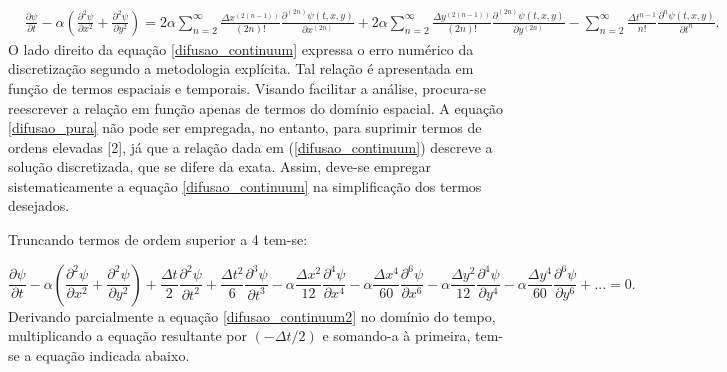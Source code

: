 \documentclass[10pt,twoside,a4paper]{article}
\begin{document}
	\begin{equation} \label{difusao_continuum}
	\begin{split}
	&\frac{\partial \psi}{\partial t} - \alpha \left( \frac{\partial^{2} \psi}{\partial x^{2}} + \frac{\partial^{2} \psi}{\partial y^{2}} \right) = 2 \alpha \sum\limits_{n=2}^{\infty} \frac{ \Delta x^{\left(2\left(n-1\right)\right)}}{\left(2n\right)!} \frac{\partial^{\left(2n\right)} \psi \left(t, x, y\right)}{\partial x^{\left(2n\right)}} + 2 \alpha \sum\limits_{n=2}^{\infty} \frac{ \Delta y^{\left(2\left(n-1\right)\right)}}{\left(2n\right)!} \frac{\partial^{\left(2n\right)} \psi \left(t, x, y\right)}{\partial y^{\left(2n\right)}} - \sum\limits_{n=2}^{\infty} \frac{\Delta t^{n-1}}{n!} \frac{\partial^{n} \psi\left(t, x, y\right)}{\partial t^{n}}. %
	\end{split}
	\end{equation}
	O lado direito da equação \ref{difusao_continuum} expressa o erro numérico da discretização segundo a metodologia explícita. Tal relação é apresentada em função de termos espaciais e temporais. Visando facilitar a análise, procura-se reescrever a relação em função apenas de termos do domínio espacial. A equação \ref{difusao_pura} não pode ser empregada, no entanto, para suprimir termos de ordens elevadas [2], já que a relação dada em (\ref{difusao_continuum}) descreve a solução discretizada, que se difere da exata. Assim, deve-se empregar sistematicamente a equação \ref{difusao_continuum} na simplificação dos termos desejados. 
	
	Truncando termos de ordem superior a 4 tem-se:
		
	\begin{equation} \label{difusao_continuum2}
	\frac{\partial \psi}{\partial t} - \alpha \left(\frac{\partial^{2} \psi}{\partial x^{2}} + \frac{\partial^{2} \psi}{\partial y^{2}} \right) + \frac{\Delta t}{2} \frac{\partial^{2} \psi}{\partial t^{2}} + \frac{\Delta t^{2}}{6} \frac{\partial^{3} \psi}{\partial t^{3}} - \alpha \frac{\Delta x^{2}}{12} \frac{\partial^{4} \psi}{\partial x^{4}} - \alpha \frac{\Delta x^{4}}{60} \frac{\partial^{6} \psi}{\partial x^{6}} - \alpha \frac{\Delta y^{2}}{12} \frac{\partial^{4} \psi}{\partial y^{4}} - \alpha \frac{\Delta y^{4}}{60} \frac{\partial^{6} \psi}{\partial y^{6}} +  ... = 0.
	\end{equation}
	Derivando parcialmente a equação \ref{difusao_continuum2} no domínio do tempo, multiplicando a equação resultante por $(-\Delta t/2)$ e somando-a à primeira, tem-se a equação indicada abaixo.
	
\end{document}
